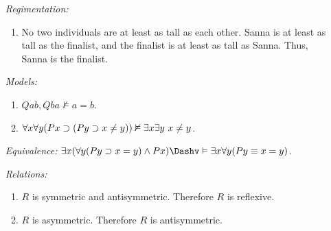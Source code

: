 \documentclass[a4paper, 11pt]{article} %
\begin{document}
\begin{enumerate}
  \item[\it Regimentation:]
    \begin{enumerate}
      \item No two individuals are at least as tall as each other. Sanna is at least as tall as the finalist, and the finalist is at least as tall as Sanna. Thus, Sanna is the finalist.
    \end{enumerate}
  \item[\it Models:]
    \begin{enumerate}
      \item $Qab, Qba \nvDash a=b$.
      \item $\forall x\forall y(Px \supset (Py \supset x \neq y)) \nvDash \exists x\exists y\ x \neq y$.
    \end{enumerate}
  \item[\it Equivalence:] $\qt{\exists}{x}(\qt{\forall}{y}(Py \supset x = y) \wedge Px) \Dashv\vDash \qt{\exists}{x}\qt{\forall}{y}(Py \equiv x = y)$.
  \item[\it Relations:]
    \begin{enumerate}
      \item $R$ is symmetric and antisymmetric. Therefore $R$ is reflexive.
      \item $R$ is asymmetric. Therefore $R$ is antisymmetric.
    \end{enumerate}
\end{enumerate}
\end{document}
